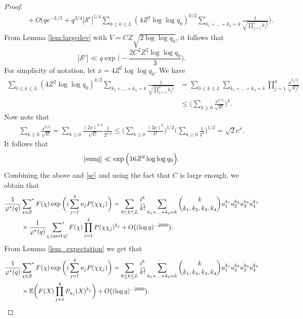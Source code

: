 \documentclass[12pt, reqno]{amsart}
\renewcommand{\pmod}[1]{\,(\mathrm{mod}\,#1)}
\newcommand{\E}{\mathbb{E}}
\numberwithin{equation}{section}
\numberwithin{theorem}{section}
\numberwithin{equation}{section}
\def\sumstar{\sideset{}{^*}\sum}
\begin{document}
\begin{proof}
\begin{align*}
&\qquad + O \Bigg(  q e^{-L/2} + q^{3/4} |\mathcal{S}^c|^{1/4} \sum_{0 \leq k \leq L} (4 Z^2 \log \log q_0)^{k/2}\sum_{k_1+\ldots +k_4=k} \frac{1}{ \sqrt{ \prod_{j=1}^4 k_j!}}  \Bigg).
\end{align*}
From Lemma \ref{lem:largedev} with $V= CZ \sqrt{2 \log\log q_0}$, it follows that
\begin{equation}
\label{sc}
    |\mathcal{S}^c| \ll q \exp \Big(  -\frac{2 C^2 Z^2 \log \log q_0}{3} \Big).
    \end{equation} 
For simplicity of notation, let $x = 4Z^2 \log \log q_0$. We have
\begin{align}
 \label{sumj}   \sum_{0 \leq k \leq L}   (4 Z^2 \log \log q_0)^{k/2}  \sum_{k_1+\ldots +k_4=k} \frac{1}{ \sqrt{ \prod_{j=1}^4k_j!}} &=  \sum_{0 \leq k \leq L}   \sum_{k_1+\ldots +k_4=k}\prod_{j=1}^4 \frac{x^{k_j/2}}{ \sqrt{  k_j!}} \\
    & \leq \Big( \sum_{k \geq 0} \frac{x^{k/2}}{\sqrt{k!}}\Big)^4. \nonumber 
\end{align}
Now note that 
\begin{align*}
  \sum_{k \geq 0} \frac{x^{k/2}}{\sqrt{k!}} = \sum_{k \geq 0} \frac{(2x)^{k/2}}{\sqrt{k!}} \frac{1}{2^{k/2}}  \leq \Big(  \sum_{k \geq 0} \frac{(2x)^k}{k!}\Big)^{1/2} \Big( \sum_{k\geq 0} \frac{1}{2^k} \Big)^{1/2}  = \sqrt{2} e^x.
\end{align*}
It follows that
\begin{equation*}
    \eqref{sumj} \ll \exp \Big(  16 Z^2 \log \log q_0 \Big).
\end{equation*}
Combining the above and \eqref{sc} and using the fact that $C$ is large enough, we obtain that 
\begin{align*}
 \frac{1}{\varphi^{*}(q)} & \sumstar_{\chi \in \mathcal{S}}  F(\chi)  
\exp\bigg(  i\sum_{j=1}^4 u_jP(\chi\chi_j)\bigg)  = \sum_{0 \leq k \leq L} \frac{i^k}{k!} \sum_{k_1+\ldots +k_4=k} {k \choose k_1,k_2,k_3,k_4} u_1^{k_1} u_2^{k_2} u_3^{k_3} u_4^{k_4} \\
& \times \frac{1}{\varphi^{*}(q)}\ \sumstar_{\chi \pmod q} F(\chi)  \prod_{j=1}^4 P(\chi \chi_j)^{k_j} +O \big( (\log q)^{-2000} \big). 
\end{align*}
From Lemma \ref{lem_expectation} we get that
\begin{align*}
 \frac{1}{\varphi^{*}(q)} & \sumstar_{\chi \in \mathcal{S}}  F(\chi)  
\exp\bigg(  i\sum_{j=1}^4 u_jP(\chi\chi_j)\bigg)  = \sum_{0 \leq k \leq L} \frac{i^k}{k!} \sum_{k_1+\ldots +k_4=k} {k \choose k_1,k_2,k_3,k_4} u_1^{k_1} u_2^{k_2} u_3^{k_3} u_4^{k_4}\\
& \times \E\bigg(  F(X) \prod_{j=1}^4 P_{\chi_j}(X)^{k_j}\bigg)+ O \big( (\log q)^{-2000} \big). 
\end{align*}


\end{proof}
\end{document}
